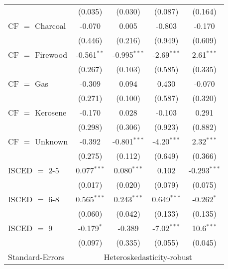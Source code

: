 \begin{table}[htbp!]
\begin{adjustbox}{width = 1\textwidth, max height = 0.95\textheight, center}
\begin{threeparttable}[b]
\begin{tabular}{lcccc}
                                 & (0.035)            & (0.030)            & (0.087)       & (0.164)\\   
            CF $=$ Charcoal      & -0.070             & 0.005              & -0.803        & -0.170\\   
                                 & (0.446)            & (0.216)            & (0.949)       & (0.609)\\   
            CF $=$ Firewood      & -0.561$^{**}$      & -0.995$^{***}$     & -2.69$^{***}$ & 2.61$^{***}$\\   
                                 & (0.267)            & (0.103)            & (0.585)       & (0.335)\\   
            CF $=$ Gas           & -0.309             & 0.094              & 0.430         & -0.070\\   
                                 & (0.271)            & (0.100)            & (0.587)       & (0.320)\\   
            CF $=$ Kerosene      & -0.170             & 0.028              & -0.103        & 0.291\\   
                                 & (0.298)            & (0.306)            & (0.923)       & (0.882)\\   
            CF $=$ Unknown       & -0.392             & -0.801$^{***}$     & -4.20$^{***}$ & 2.32$^{***}$\\   
                                 & (0.275)            & (0.112)            & (0.649)       & (0.366)\\   
            ISCED $=$ 2-5        & 0.077$^{***}$      & 0.080$^{***}$      & 0.102         & -0.293$^{***}$\\   
                                 & (0.017)            & (0.020)            & (0.079)       & (0.075)\\   
            ISCED $=$ 6-8        & 0.565$^{***}$      & 0.243$^{***}$      & 0.649$^{***}$ & -0.262$^{*}$\\   
                                 & (0.060)            & (0.042)            & (0.133)       & (0.135)\\   
            ISCED $=$ 9          & -0.179$^{*}$       & -0.389             & -7.02$^{***}$ & 10.6$^{***}$\\   
                                 & (0.097)            & (0.335)            & (0.055)       & (0.045)\\   
            \midrule 
            Standard-Errors & \multicolumn{4}{c}{Heteroskedasticity-robust} \\ 

\end{tabular}
\end{threeparttable}
\end{adjustbox}
\end{table}
